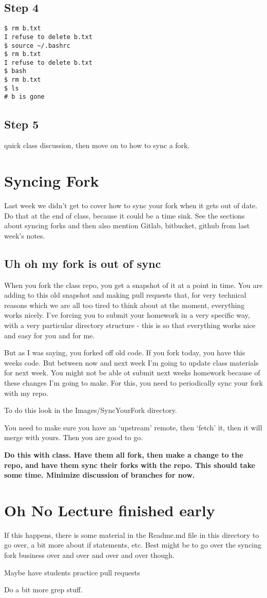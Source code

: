 \documentclass[10pt]{article}
\begin{document}
\subsection{ Step 4}
\begin{lstlisting}[style=term]
$ rm b.txt
I refuse to delete b.txt
$ source ~/.bashrc
$ rm b.txt
I refuse to delete b.txt
$ bash
$ rm b.txt
$ ls
# b is gone
\end{lstlisting}

\subsection{ Step 5 }
quick class discussion, then move on to how to sync a fork.

\section{Syncing Fork}
Last week we didn't get to cover how to sync your fork when it gets out of date.
Do that at the end of class, because it could be a time sink. See the sections
about syncing forks and then also mention Gitlab, bitbucket, github from last
week's notes.

\subsection{Uh oh my fork is out of sync}
When you fork the class repo, you get a snapshot of it at a point in time. You
are adding to this old snapshot and making pull requests that, for very
technical reasons which we are all too tired to think about at the moment,
everything works nicely. I've forcing you to submit your homework in a very
specific way, with a very particular directory structure - this is so that
everything works nice and easy for you and for me.

But as  I was saying, you forked off old code. If you fork today, you have this
weeks code. But between now and next week I'm going to update class materials
for next week. You might not be able ot submit next weeks homework because of
these changes I'm going to make. For this, you need to periodically sync your
fork with my repo.

To do this look in the Images/SyncYourFork directory.

You need to make sure you have an `upstream' remote, then `fetch' it, then it
will merge with yours. Then you are good to go. 

\textbf{Do this with class. Have them all fork, then make a change to the repo,
and have them sync their forks with the repo. This should take some time.
Minimize discussion of branches for now.}

\section{Oh No Lecture finished early}
If this happens, there is some material in the Readme.md file in this directory
to go over, a bit more about if statements, etc. Best might be to go over the
syncing fork business over and over and over and over though.

Maybe have students practice pull requests

Do a bit more grep stuff.
\end{document}

